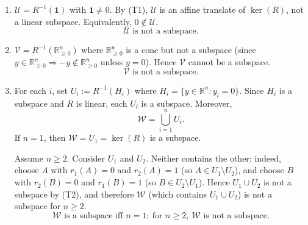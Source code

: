 \documentclass[12pt]{article}
\begin{document}
\begin{enumerate}[label=(\alph*)]
\item $\mathcal{U}=R^{-1}(\mathbf{1})$ with $\mathbf{1}\neq 0$. By (T1), $\mathcal{U}$ is an affine translate of $\ker(R)$, not a linear subspace. Equivalently, $0\notin\mathcal{U}$.
\[
\boxed{\,\mathcal{U}\text{ is not a subspace.}\,}
\]

\item $\mathcal{V}=R^{-1}(\mathbb{R}_{\ge 0}^n)$ where $\mathbb{R}_{\ge 0}^n$ is a cone but not a subspace (since $y\in \mathbb{R}_{\ge 0}^n\Rightarrow -y\notin \mathbb{R}_{\ge 0}^n$ unless $y=0$). Hence $\mathcal{V}$ cannot be a subspace.
\[
\boxed{\,\mathcal{V}\text{ is not a subspace.}\,}
\]

\item For each $i$, set $U_i:=R^{-1}(H_i)$ where $H_i=\{y\in\mathbb{R}^n:y_i=0\}$. Since $H_i$ is a subspace and $R$ is linear, each $U_i$ is a subspace. Moreover,
\[
\mathcal{W}=\bigcup_{i=1}^n U_i.
\]
If $n=1$, then $\mathcal{W}=U_1=\ker(R)$ is a subspace.

Assume $n\ge 2$. Consider $U_1$ and $U_2$. Neither contains the other: indeed, choose $A$ with $r_1(A)=0$ and $r_2(A)=1$ (so $A\in U_1\setminus U_2$), and choose $B$ with $r_2(B)=0$ and $r_1(B)=1$ (so $B\in U_2\setminus U_1$). Hence $U_1\cup U_2$ is not a subspace by (T2), and therefore $\mathcal{W}$ (which contains $U_1\cup U_2$) is not a subspace for $n\ge 2$.
\[
\boxed{\,\mathcal{W}\text{ is a subspace iff }n=1;\ \text{for }n\ge 2,\ \mathcal{W}\text{ is not a subspace.}\,}
\]
\end{enumerate}
\end{document}
